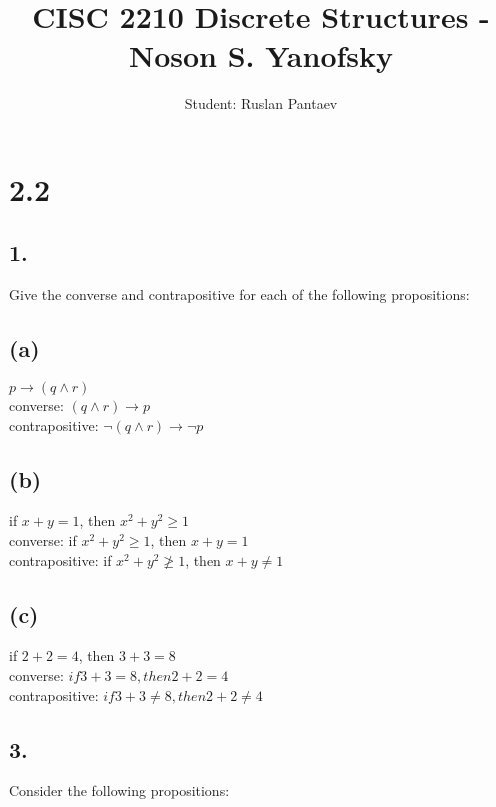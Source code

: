 \documentclass[11pt]{article}
\begin{document}
\title{CISC 2210 Discrete Structures - Noson S. Yanofsky}
\author{Student: Ruslan Pantaev}
\maketitle

\section*{2.2}
%
%
\subsection*{1.}
\begin{center}
Give the converse and contrapositive for each of the following propositions:
\end{center}

\subsection*{(a)}
\begin{center}
$p \rightarrow (q \wedge r)$\\
\hfill \break
converse: $(q \wedge r) \rightarrow p$\\
contrapositive: $\neg (q \wedge r) \rightarrow \neg p$
\end{center}

\subsection*{(b)}
\begin{center}
if $x + y = 1$, then $x^{2} + y^{2} \geq 1$\\
\hfill \break
converse: if $x^{2} + y^{2} \geq 1$, then $x + y  = 1$\\
contrapositive: if $x^{2} + y^{2} \ngeq 1$, then $x + y  \neq 1$
\end{center}

\subsection*{(c)}
\begin{center}
if $2 + 2 = 4$, then $3 + 3 = 8$\\
\hfill \break
converse: $if 3 + 3 = 8, then 2 + 2 = 4$\\
contrapositive: $if 3 + 3 \neq 8, then 2 + 2 \neq 4$
\end{center}
%
%
\subsection*{3.}
\begin{center}
Consider the following propositions:\\
\end{center}
\end{document}
